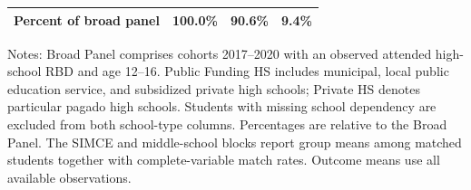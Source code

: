\begin{table}[H]
\begin{tabular}{@{}lccc@{}}
Percent of broad panel & 100.0\% & 90.6\% & 9.4\% \\
\bottomrule
\end{tabular}
\par\medskip\footnotesize
\begin{minipage}{\textwidth}
Notes: Broad Panel comprises cohorts 2017--2020 with an observed attended high-school RBD and age 12--16. Public Funding HS includes municipal, local public education service, and subsidized private high schools; Private HS denotes particular pagado high schools. Students with missing school dependency are excluded from both school-type columns. Percentages are relative to the Broad Panel. The SIMCE and middle-school blocks report group means among matched students together with complete-variable match rates. Outcome means use all available observations.
\end{minipage}
\end{table}
